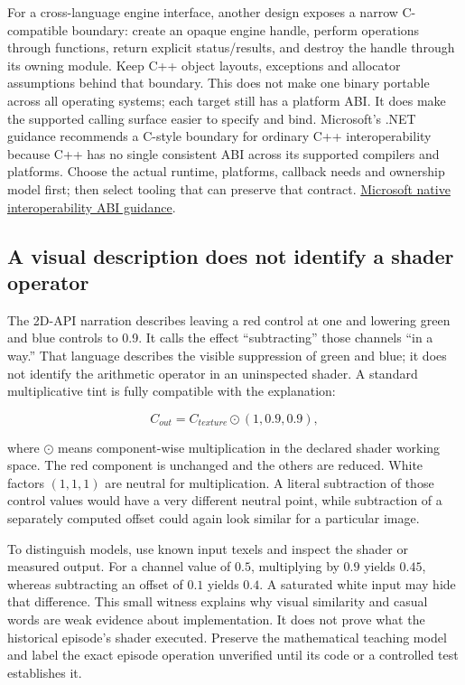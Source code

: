 For a cross-language engine interface, another design exposes a narrow C-compatible boundary: create an opaque engine handle, perform operations through functions, return explicit status/results, and destroy the handle through its owning module. Keep C++ object layouts, exceptions and allocator assumptions behind that boundary. This does not make one binary portable across all operating systems; each target still has a platform ABI. It does make the supported calling surface easier to specify and bind. Microsoft's .NET guidance recommends a C-style boundary for ordinary C++ interoperability because C++ has no single consistent ABI across its supported compilers and platforms. Choose the actual runtime, platforms, callback needs and ownership model first; then select tooling that can preserve that contract. \href{https://learn.microsoft.com/dotnet/standard/native-interop/abi-support}{Microsoft native interoperability ABI guidance}.

\subsection{A visual description does not identify a shader operator}\label{01-foundations-i-ch016-a-visual-description-does-not-identify-a-shader-operator}

\hypertarget{01-foundations-i-ch016-a-visual-description-does-not-identify-a-shader-operator}{}

The 2D-API narration describes leaving a red control at one and lowering green and blue controls to 0.9. It calls the effect ``subtracting'' those channels ``in a way.'' That language describes the visible suppression of green and blue; it does not identify the arithmetic operator in an uninspected shader. A standard multiplicative tint is fully compatible with the explanation:

\[
C_{out}=C_{texture}\odot(1,0.9,0.9),
\]

where \(\odot\) means component-wise multiplication in the declared shader working space. The red component is unchanged and the others are reduced. White factors \((1,1,1)\) are neutral for multiplication. A literal subtraction of those control values would have a very different neutral point, while subtraction of a separately computed offset could again look similar for a particular image.

To distinguish models, use known input texels and inspect the shader or measured output. For a channel value of \(0.5\), multiplying by \(0.9\) yields \(0.45\), whereas subtracting an offset of \(0.1\) yields \(0.4\). A saturated white input may hide that difference. This small witness explains why visual similarity and casual words are weak evidence about implementation. It does not prove what the historical episode's shader executed. Preserve the mathematical teaching model and label the exact episode operation unverified until its code or a controlled test establishes it.

